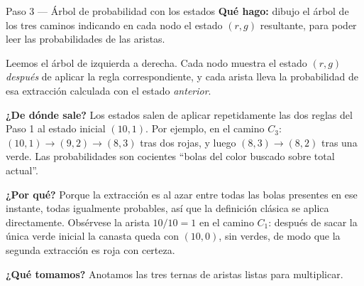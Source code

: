 \documentclass[11pt]{article}
\begin{document}
\begin{paso}{Paso 3 --- Árbol de probabilidad con los estados}
\textbf{Qué hago:} dibujo el árbol de los tres caminos indicando en cada nodo el estado $(r,g)$ resultante, para poder leer las probabilidades de las aristas.

\begin{center}
\end{center}

Leemos el árbol de izquierda a derecha. Cada nodo muestra el estado $(r,g)$ \emph{después} de aplicar la regla correspondiente, y cada arista lleva la probabilidad de esa extracción calculada con el estado \emph{anterior}.

\textbf{¿De dónde sale?} Los estados salen de aplicar repetidamente las dos reglas del Paso 1 al estado inicial $(10,1)$. Por ejemplo, en el camino $C_3$: $(10,1)\to(9,2)\to(8,3)$ tras dos rojas, y luego $(8,3)\to(8,2)$ tras una verde. Las probabilidades son cocientes ``bolas del color buscado sobre total actual''.

\textbf{¿Por qué?} Porque la extracción es al azar entre todas las bolas presentes en ese instante, todas igualmente probables, así que la definición clásica se aplica directamente. Obsérvese la arista $10/10=1$ en el camino $C_1$: después de sacar la única verde inicial la canasta queda con $(10,0)$, sin verdes, de modo que la segunda extracción es roja con certeza.

\textbf{¿Qué tomamos?} Anotamos las tres ternas de aristas listas para multiplicar.
\end{paso}
\end{document}
